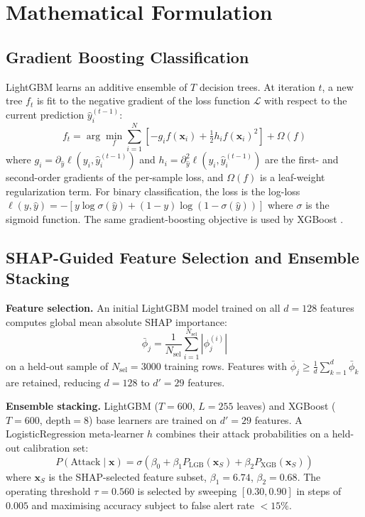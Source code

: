 \documentclass[twocolumn, 10pt, letterpaper]{article}
\begin{document}
\section{Mathematical Formulation}
\label{sec:math}

\subsection{Gradient Boosting Classification}

LightGBM \cite{ke2017lightgbm} learns an additive ensemble of $T$ decision trees.
At iteration $t$, a new tree $f_t$ is fit to the negative gradient of the
loss function $\mathcal{L}$ with respect to the current prediction $\hat{y}_i^{(t-1)}$:
\begin{equation}
    f_t = \arg\min_{f} \sum_{i=1}^{N}
    \left[
        -g_i f(\mathbf{x}_i) + \tfrac{1}{2} h_i f(\mathbf{x}_i)^2
    \right]
    + \Omega(f)
\end{equation}
where $g_i = \partial_{\hat{y}} \ell(y_i, \hat{y}_i^{(t-1)})$ and
$h_i = \partial^2_{\hat{y}} \ell(y_i, \hat{y}_i^{(t-1)})$ are the first- and
second-order gradients of the per-sample loss, and $\Omega(f)$ is a
leaf-weight regularization term.
For binary classification, the loss is the log-loss
$\ell(y, \hat{y}) = -[y \log \sigma(\hat{y}) + (1{-}y)\log(1{-}\sigma(\hat{y}))]$
where $\sigma$ is the sigmoid function.
The same gradient-boosting objective is used by XGBoost \cite{chen2016xgboost}.

\subsection{SHAP-Guided Feature Selection and Ensemble Stacking}

\textbf{Feature selection.}
An initial LightGBM model trained on all $d{=}128$ features computes global mean
absolute SHAP importance:
\begin{equation}
    \bar{\phi}_j = \frac{1}{N_{\text{sel}}} \sum_{i=1}^{N_{\text{sel}}} |\phi_j^{(i)}|
\end{equation}
on a held-out sample of $N_{\text{sel}} = 3000$ training rows.
Features with $\bar{\phi}_j \geq \frac{1}{d}\sum_{k=1}^{d}\bar{\phi}_k$ are retained,
reducing $d{=}128$ to $d'{=}29$ features.

\textbf{Ensemble stacking.}
LightGBM ($T{=}600$, $L{=}255$ leaves) and XGBoost ($T{=}600$, $\text{depth}{=}8$)
base learners are trained on $d'{=}29$ features.
A LogisticRegression meta-learner $h$ combines their attack probabilities on a
held-out calibration set:
\begin{equation}
    P(\text{Attack} \mid \mathbf{x}) =
    \sigma\!\left(\beta_0 + \beta_1 P_{\text{LGB}}(\mathbf{x}_S) + \beta_2 P_{\text{XGB}}(\mathbf{x}_S)\right)
\end{equation}
where $\mathbf{x}_S$ is the SHAP-selected feature subset, $\beta_1 = 6.74$, $\beta_2 = 0.68$.
The operating threshold $\tau = 0.560$ is selected by sweeping $[0.30, 0.90]$ in
steps of $0.005$ and maximising accuracy subject to false alert rate $< 15\%$.
\end{document}
